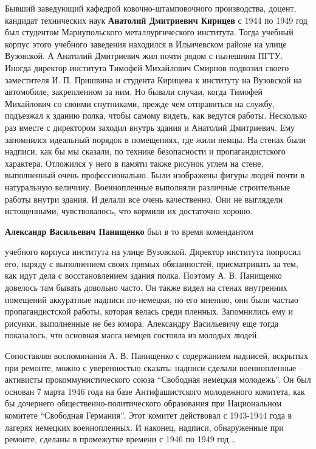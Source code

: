 Бывший заведующий кафедрой ковочно-штамповочного производства, доцент, кандидат
технических наук \textbf{Анатолий Дмитриевич Кирицев} с 1944 по 1949 год был студентом
Мариупольского металлургического института. Тогда учебный корпус этого учебного
заведения находился в Ильичевском районе на улице Вузовской. А Анатолий
Дмитриевич жил почти рядом с нынешним ПГТУ. Иногда директор института Тимофей
Михайлович Смирнов подвозил своего заместителя И. П. Пришвина и студента
Кирицева к институту на Вузовской на автомобиле, закрепленном за ним. Но бывали
случаи, когда Тимофей Михайлович со своими спутниками, прежде чем отправиться
на службу, подъезжал к зданию полка, чтобы самому видеть, как ведутся работы.
Несколько раз вместе с директором заходил внутрь здания и Анатолий Дмитриевич.
Ему запомнился идеальный порядок в помещениях, где жили немцы. На стенах были
надписи, как бы мы сказали, по технике безопасности и пропагандистского
характера. Отложился у него в памяти также рисунок углем на стене, выполненный
очень профессионально. Были изображены фигуры людей почти в натуральную
величину. Военнопленные выполняли различные строительные работы внутри здания.
И делали все очень качественно. Они не выглядели истощенными, чувствовалось,
что кормили их достаточно хорошо.

\textbf{Александр Васильевич Панищенко} был в то время комендантом\par учебного корпуса
института на улице Вузовской. Директор института попросил его, наряду с
выполнением своих прямых обязанностей, присматривать за тем, как идут дела с
восстановлением здания полка. Поэтому А. В. Панищенко довелось там бывать
довольно часто. Он также видел на стенах внутренних помещений аккуратные
надписи по-немецки, по его мнению, они были частью пропагандистской работы,
которая велась среди пленных. Запомнились ему и рисунки, выполненные не без
юмора. Александру Васильевичу еще тогда показалось, что основная масса немцев
состояла из молодых людей.

Сопоставляя воспоминания А. В. Панищенко с содержанием надписей, вскрытых при
ремонте, можно с уверенностью сказать: надписи сделали военнопленные –
активисты прокоммунистического союза \enquote{Свободная немецкая молодежь}. Он был
основан 7 марта 1946 года на базе Антифашистского молодежного комитета, как бы
дочернего общественно-политического образования при Национальном комитете
\enquote{Свободная Германия}. Этот комитет действовал с 1943-1944 года в лагерях
немецких военнопленных. И наконец, надписи, обнаруженные при ремонте, сделаны в
промежутке времени с 1946 по 1949 год...

